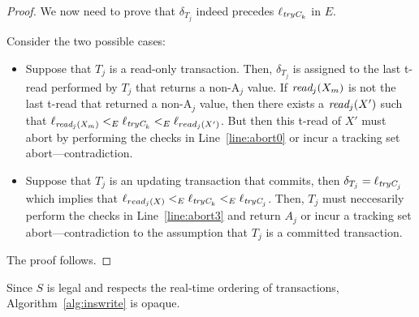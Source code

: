 \begin{proof}
We now need to prove that $\delta_{T_{j}}$ indeed precedes $\ell_{\textit{tryC}_k}$ in $E$.

Consider the two possible cases:
%
\begin{itemize}
\item
Suppose that $T_j$ is a read-only transaction. 
Then, $\delta_{T_j}$ is assigned to the last t-read performed by $T_j$ that returns a non-A$_j$ value. 
If $\textit{read}_j(X_m)$ is not the last t-read that returned a non-A$_j$ value, then there exists a $\textit{read}_j(X')$ such that 
$\ell_{\textit{read}_j(X_m)} <_{E} \ell_{\textit{tryC}_k} <_E \ell_{read_j(X')}$.
But then this t-read of $X'$ must abort by performing the checks in Line~\ref{line:abort0} or incur a tracking set abort---contradiction.
\item
Suppose that $T_j$ is an updating transaction that commits, then $\delta_{T_j}=\ell_{\textit{tryC}_j}$ which implies that
$\ell_{read_j(X)} <_{E} \ell_{\textit{tryC}_k} <_E \ell_{\textit{tryC}_j}$. Then, $T_j$ must neccesarily perform the checks
in Line~\ref{line:abort3} and return $A_j$ or incur a tracking set abort---contradiction to the assumption that $T_j$ is a committed transaction.
\end{itemize}
%
The proof follows.
%
\end{proof}
%
Since $S$ is legal and respects the real-time ordering of transactions, Algorithm~\ref{alg:inswrite} is opaque.
%
